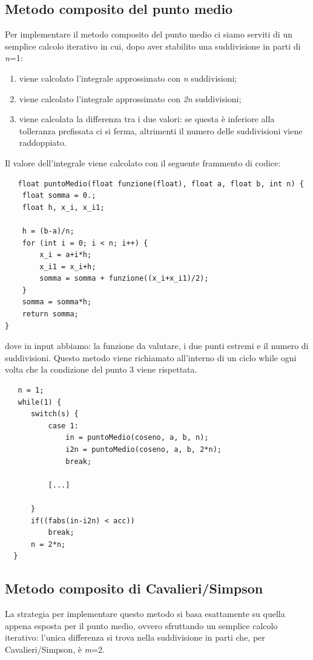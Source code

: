 \documentclass{article}
\begin{document}
\subsection{Metodo composito del punto medio}
Per implementare il metodo composito del punto medio ci siamo serviti di un semplice calcolo iterativo in cui, dopo aver stabilito una suddivisione in parti di \textit{n}=1:
\begin{enumerate}
   \item viene calcolato l'integrale approssimato con \textit{n} suddivisioni;
   \item viene calcolato l'integrale approssimato con \textit{2n} suddivisioni;
   \item viene calcolata la differenza tra i due valori: se questa è inferiore alla tolleranza prefissata ci si ferma, altrimenti il numero delle suddivisioni viene raddoppiato.
\end{enumerate}
Il valore dell'integrale viene calcolato con il seguente frammento di codice:
\begin{lstlisting}
   float puntoMedio(float funzione(float), float a, float b, int n) {
    float somma = 0.;
    float h, x_i, x_i1;

    h = (b-a)/n;
    for (int i = 0; i < n; i++) {
        x_i = a+i*h;
        x_i1 = x_i+h;
        somma = somma + funzione((x_i+x_i1)/2);
    }
    somma = somma*h;
    return somma;
}
\end{lstlisting}
dove in input abbiamo: la funzione da valutare, i due punti estremi e il numero di suddivisioni. Questo metodo viene richiamato all'interno di un ciclo while ogni volta che la condizione 
del punto 3 viene rispettata.
\begin{lstlisting}
   n = 1;
   while(1) {
      switch(s) {
          case 1:
              in = puntoMedio(coseno, a, b, n);
              i2n = puntoMedio(coseno, a, b, 2*n);
              break;

          [...]

      }     
      if((fabs(in-i2n) < acc))
          break;
      n = 2*n;
  } 
\end{lstlisting}
\subsection{Metodo composito di Cavalieri/Simpson}
La strategia per implementare questo metodo si basa esattamente su quella appena esposta per il punto medio, ovvero sfruttando un semplice calcolo iterativo: l'unica differenza si trova 
nella suddivisione in parti che, per Cavalieri/Simpson, è \textit{m}=2.
\end{document}
